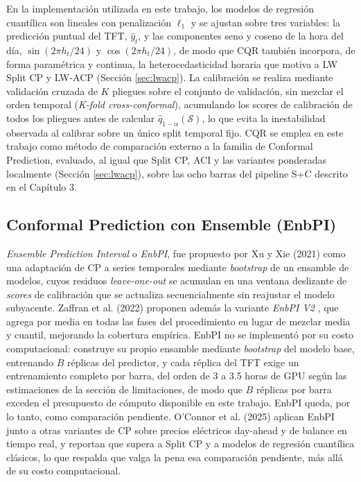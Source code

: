 En la implementación utilizada en este trabajo, los modelos de regresión cuantílica son lineales con penalización $\ell_1$ y se ajustan sobre tres variables: la predicción puntual del TFT, $\hat{y}_t$, y las componentes seno y coseno de la hora del día, $\sin(2\pi h_t/24)$ y $\cos(2\pi h_t/24)$, de modo que CQR también incorpora, de forma paramétrica y continua, la heterocedasticidad horaria que motiva a LW Split CP y LW-ACP (Sección \ref{sec:lwacp}). La calibración se realiza mediante validación cruzada de $K$ pliegues sobre el conjunto de validación, sin mezclar el orden temporal (\textit{K-fold cross-conformal}), acumulando los scores de calibración de todos los pliegues antes de calcular $\hat{q}_{1-\alpha}(\mathcal{S})$, lo que evita la inestabilidad observada al calibrar sobre un único split temporal fijo. CQR se emplea en este trabajo como método de comparación externo a la familia de Conformal Prediction, evaluado, al igual que Split CP, ACI y las variantes ponderadas localmente (Sección \ref{sec:lwacp}), sobre las ocho barras del pipeline S+C descrito en el Capítulo 3.

\subsection{Conformal Prediction con Ensemble (EnbPI)}

\textit{Ensemble Prediction Interval} o \textit{EnbPI}, fue propuesto por Xu y Xie (2021) \cite{XuCP} como una adaptación de CP a series temporales mediante \textit{bootstrap} de un ensamble de modelos, cuyos residuos \textit{leave-one-out} se acumulan en una ventana deslizante de \textit{scores} de calibración que se actualiza secuencialmente sin reajustar el modelo subyacente. Zaffran et al. (2022) proponen además la variante \textit{EnbPI V2} \cite{ZaffranICML2022}, que agrega por media en todas las fases del procedimiento en lugar de mezclar media y cuantil, mejorando la cobertura empírica. EnbPI no se implementó por su costo computacional: construye su propio ensamble mediante \textit{bootstrap} del modelo base, entrenando $B$ réplicas del predictor, y cada réplica del TFT exige un entrenamiento completo por barra, del orden de 3 a 3.5 horas de GPU según las estimaciones de la sección de limitaciones, de modo que $B$ réplicas por barra exceden el presupuesto de cómputo disponible en este trabajo. EnbPI queda, por lo tanto, como comparación pendiente. O'Connor et al. (2025) \cite{OConnorCP2025} aplican EnbPI junto a otras variantes de CP sobre precios eléctricos day-ahead y de balance en tiempo real, y reportan que supera a Split CP y a modelos de regresión cuantílica clásicos, lo que respalda que valga la pena esa comparación pendiente, más allá de su costo computacional.

